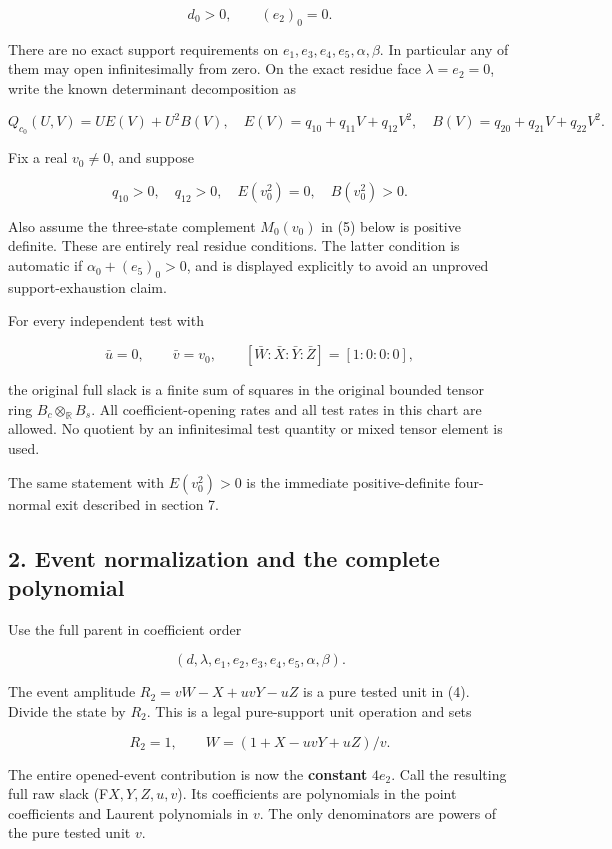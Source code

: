\[
d_0>0,\qquad (e_2)_0=0.
\tag{1}
\]

There are no exact support requirements on \(e_1,e_3,e_4,e_5,\alpha,\beta\).
In particular any of them may open infinitesimally from zero. On the exact
residue face \(\lambda=e_2=0\), write the known determinant decomposition as

\[
Q_{c_0}(U,V)=U E(V)+U^2 B(V),
\quad E(V)=q_{10}+q_{11}V+q_{12}V^2,
\quad B(V)=q_{20}+q_{21}V+q_{22}V^2.
\tag{2}
\]

Fix a real \(v_0\ne0\), and suppose

\[
q_{10}>0,\quad q_{12}>0,\quad E(v_0^2)=0,\quad B(v_0^2)>0.
\tag{3}
\]

Also assume the three-state complement \(M_0(v_0)\) in (5) below is positive
definite. These are entirely real residue conditions. The latter condition
is automatic if \(\alpha_0+(e_5)_0>0\), and is displayed explicitly to avoid
an unproved support-exhaustion claim.

For every independent test with

\[
\bar u=0,\qquad \bar v=v_0,
\qquad [\bar W:\bar X:\bar Y:\bar Z]=[1:0:0:0],
\tag{4}
\]

the original full slack is a finite sum of squares in the original bounded
tensor ring \(B_c\otimes_{\mathbb R}B_s\). All coefficient-opening rates and
all test rates in this chart are allowed. No quotient by an infinitesimal
test quantity or mixed tensor element is used.

The same statement with \(E(v_0^2)>0\) is the immediate positive-definite
four-normal exit described in section 7.

\hypertarget{event-normalization-and-the-complete-polynomial}{%
\subsection{2. Event normalization and the complete polynomial}\label{p4ec1a51262f9:event-normalization-and-the-complete-polynomial}}

Use the full parent in coefficient order

\[
(d,\lambda,e_1,e_2,e_3,e_4,e_5,\alpha,\beta).
\]

The event amplitude \(R_2=vW-X+uvY-uZ\) is a pure tested unit in (4).
Divide the state by \(R_2\). This is a legal pure-support unit operation and
sets

\[
R_2=1,\qquad W=(1+X-uvY+uZ)/v.
\]

The entire opened-event contribution is now the \textbf{constant} \(4e_2\).
Call the resulting full raw slack (F\(X,Y,Z,u,v\)). Its coefficients are
polynomials in the point coefficients and Laurent polynomials in \(v\).
The only denominators are powers of the pure tested unit \(v\).

